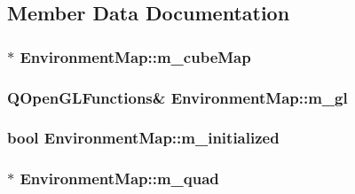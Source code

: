 \subsection{Member Data Documentation}
\hypertarget{class_environment_map_a71fa459b1a6a88e3590cd38109bfc912}{
\subsubsection[{m\+\_\+cube\+Map}]{$\ast$ Environment\+Map\+::m\+\_\+cube\+Map\hspace{0.3cm}{\ttfamily [protected]}}}\label{class_environment_map_a71fa459b1a6a88e3590cd38109bfc912}
\hypertarget{class_environment_map_ad55c368a6c119293a62818a89c80da0a}{
\subsubsection[{m\+\_\+gl}]{\setlength{\rightskip}{0pt plus 5cm}Q\+Open\+G\+L\+Functions\& Environment\+Map\+::m\+\_\+gl\hspace{0.3cm}{\ttfamily [protected]}}}\label{class_environment_map_ad55c368a6c119293a62818a89c80da0a}
\hypertarget{class_environment_map_af40184d2ae6b58e909fd3c6bf1c32284}{
\subsubsection[{m\+\_\+initialized}]{\setlength{\rightskip}{0pt plus 5cm}bool Environment\+Map\+::m\+\_\+initialized\hspace{0.3cm}{\ttfamily [protected]}}}\label{class_environment_map_af40184d2ae6b58e909fd3c6bf1c32284}
\hypertarget{class_environment_map_a2d4e6cabcbc17b659bf6dbc68069767c}{
\subsubsection[{m\+\_\+quad}]{$\ast$ Environment\+Map\+::m\+\_\+quad\hspace{0.3cm}{\ttfamily [protected]}}}\label{class_environment_map_a2d4e6cabcbc17b659bf6dbc68069767c}
